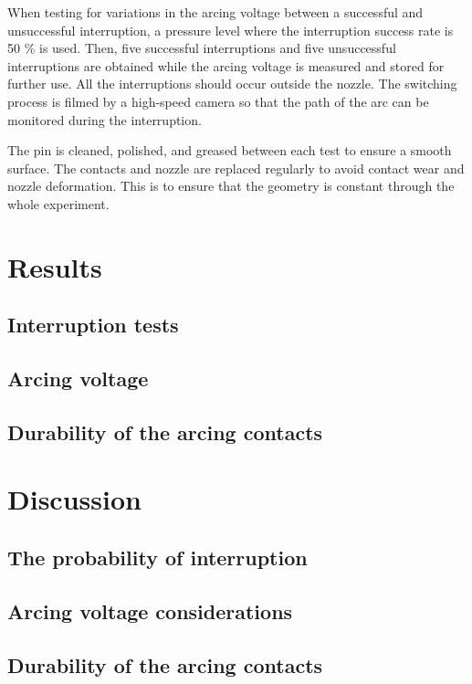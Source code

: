 \documentclass[10pt,a4paper,twoside]{article}
\begin{document}
When testing for variations in the arcing voltage between a successful and unsuccessful interruption, a pressure level where the interruption success rate is 50 \% is used. Then, five successful interruptions and five unsuccessful interruptions are obtained while the arcing voltage is measured and stored for further use. All the interruptions should occur outside the nozzle. The switching process is filmed by a high-speed camera so that the path of the arc can be monitored during the interruption.

The pin is cleaned, polished, and greased between each test to ensure a smooth surface. The contacts and nozzle are replaced regularly to avoid contact wear and nozzle deformation. This is to ensure that the geometry is constant through the whole experiment.
\cleardoublepage

\section{Results}
\subsection{Interruption tests} 


\newpage
\subsection{Arcing voltage}


\newpage
\subsection{Durability of the arcing contacts} \label{sec:durability}



\cleardoublepage

\section{Discussion}
\subsection{The probability of interruption} 


\subsection{Arcing voltage considerations}
 

\subsection{Durability of the arcing contacts} \label{fig:durability}
\end{document}
